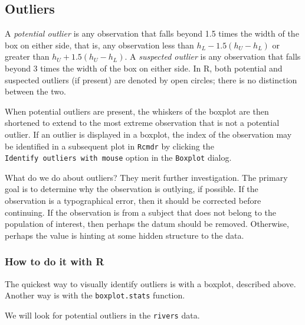 \documentclass[]{book}
\newenvironment{Shaded}{\begin{snugshade}}{\end{snugshade}}
\newcommand{\KeywordTok}[1]{\textcolor[rgb]{0.13,0.29,0.53}{\textbf{{#1}}}}
\newcommand{\NormalTok}[1]{{#1}}
\numberwithin{equation}{chapter}
\numberwithin{figure}{chapter}
\theoremstyle{plain}
\theoremstyle{definition}
\theoremstyle{remark}
\theoremstyle{definition}
\theoremstyle{definition}
\theoremstyle{remark}
\let\BeginKnitrBlock\begin \let\EndKnitrBlock\end
\begin{document}
\subsection{Outliers}\label{sub-outliers}

A \emph{potential outlier} is any observation that falls beyond 1.5
times the width of the box on either side, that is, any observation less
than \(h_{L}-1.5(h_{U}-h_{L})\) or greater than
\(h_{U}+1.5(h_{U}-h_{L})\). A \emph{suspected outlier} is any
observation that falls beyond 3 times the width of the box on either
side. In R, both potential and suspected outliers (if present) are
denoted by open circles; there is no distinction between the two.

When potential outliers are present, the whiskers of the boxplot are
then shortened to extend to the most extreme observation that is not a
potential outlier. If an outlier is displayed in a boxplot, the index of
the observation may be identified in a subsequent plot in \texttt{Rcmdr}
by clicking the \texttt{Identify\ outliers\ with\ mouse} option in the
\texttt{Boxplot} dialog.

What do we do about outliers? They merit further investigation. The
primary goal is to determine why the observation is outlying, if
possible. If the observation is a typographical error, then it should be
corrected before continuing. If the observation is from a subject that
does not belong to the population of interest, then perhaps the datum
should be removed. Otherwise, perhaps the value is hinting at some
hidden structure to the data.

\subsubsection{How to do it with R}\label{how-to-do-it-with-r-6}

The quickest way to visually identify outliers is with a boxplot,
described above. Another way is with the \texttt{boxplot.stats}
function.

\bigskip

\BeginKnitrBlock{example}[Lengths of Major North American Rivers]
\protect\hypertarget{ex:unnamed-chunk-61}{}{\label{ex:unnamed-chunk-61}
\iffalse (Lengths of Major North American Rivers) \fi }We will look for
potential outliers in the \texttt{rivers} data.
\EndKnitrBlock{example}

\begin{Shaded}
\end{Shaded}
\end{document}
